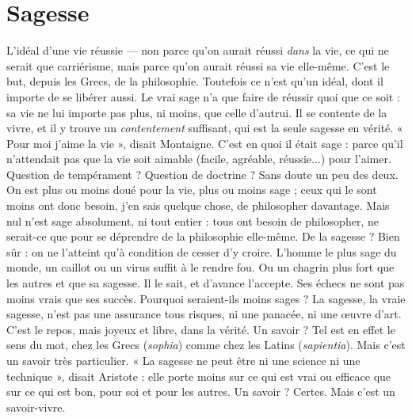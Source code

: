 \section{Sagesse}
L'idéal d’une vie réussie — non parce qu’on aurait réussi {\it dans} la vie,
ce qui ne serait que carriérisme, mais parce qu’on aurait réussi sa
vie elle-même. C’est le but, depuis les Grecs, de la philosophie. Toutefois ce
n'est qu’un idéal, dont il importe de se libérer aussi. Le vrai sage n’a que faire
de réussir quoi que ce soit : sa vie ne lui importe pas plus, ni moins, que celle
d'autrui. Il se contente de la vivre, et il y trouve un {\it contentement} suffisant, qui
est la seule sagesse en vérité. « Pour moi j'aime la vie », disait Montaigne. C’est
en quoi il était sage : parce qu’il n’attendait pas que la vie soit aimable (facile,
agréable, réussie...) pour l'aimer. Question de tempérament ? Question de
doctrine ? Sans doute un peu des deux. On est plus ou moins doué pour la vie,
plus ou moins sage ; ceux qui le sont moins ont donc besoin, j’en sais quelque
chose, de philosopher davantage. Mais nul n’est sage absolument, ni tout entier :
tous ont besoin de philosopher, ne serait-ce que pour se déprendre de la philosophie
elle-même. De la sagesse ? Bien sûr : on ne l’atteint qu’à condition de
cesser d’y croire. L'homme le plus sage du monde, un caillot ou un virus suffit
à le rendre fou. Ou un chagrin plus fort que les autres et que sa sagesse. Il le
sait, et d'avance l’accepte. Ses échecs ne sont pas moins vrais que ses succès.
Pourquoi seraient-ils moins sages ? La sagesse, la vraie sagesse, n’est pas une
assurance tous risques, ni une panacée, ni une œuvre d’art. C’est le repos, mais
joyeux et libre, dans la vérité. Un savoir ? Tel est en effet le sens du mot, chez
les Grecs ({\it sophia}) comme chez les Latins ({\it sapientia}). Mais c’est un savoir très
particulier. « La sagesse ne peut être ni une science ni une technique », disait
Aristote : elle porte moins sur ce qui est vrai ou efficace que sur ce qui est bon,
pour soi et pour les autres. Un savoir ? Certes. Mais c’est un savoir-vivre.

